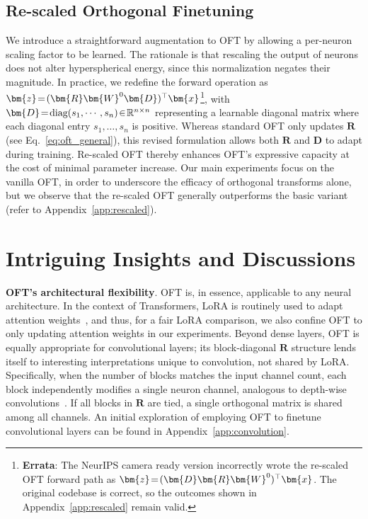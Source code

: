\subsection{Re-scaled Orthogonal Finetuning}

We introduce a straightforward augmentation to OFT by allowing a per-neuron scaling factor to be learned. The rationale is that rescaling the output of neurons does not alter hyperspherical energy, since this normalization negates their magnitude. In practice, we redefine the forward operation as $\thickmuskip=2mu \medmuskip=2mu\bm{z}=(\bm{R}\bm{W}^0\bm{D})^\top\bm{x}$\footnote{\textbf{Errata}: The NeurIPS camera ready version incorrectly wrote the re-scaled OFT forward path as $\thickmuskip=2mu \medmuskip=2mu\bm{z}=(\bm{D}\bm{R}\bm{W}^0)^\top\bm{x}$. The original codebase is correct, so the outcomes shown in Appendix~\ref{app:rescaled} remain valid.}, with $\thickmuskip=2mu \medmuskip=2mu \bm{D}=\text{diag}(s_1,\cdots,s_n)\in\mathbb{R}^{n\times n}$ representing a learnable diagonal matrix where each diagonal entry $s_1,\ldots,s_n$ is positive. Whereas standard OFT only updates $\bm{R}$ (see Eq.~\eqref{eq:oft_general}), this revised formulation allows both $\bm{R}$ and $\bm{D}$ to adapt during training. Re-scaled OFT thereby enhances OFT's expressive capacity at the cost of minimal parameter increase. Our main experiments focus on the vanilla OFT, in order to underscore the efficacy of orthogonal transforms alone, but we observe that the re-scaled OFT generally outperforms the basic variant (refer to Appendix~\ref{app:rescaled}).

\section{Intriguing Insights and Discussions}

\textbf{OFT's architectural flexibility}. OFT is, in essence, applicable to any neural architecture. In the context of Transformers, LoRA is routinely used to adapt attention weights~\cite{hulora2022}, and thus, for a fair LoRA comparison, we also confine OFT to only updating attention weights in our experiments. Beyond dense layers, OFT is equally appropriate for convolutional layers; its block-diagonal $\bm{R}$ structure lends itself to interesting interpretations unique to convolution, not shared by LoRA. Specifically, when the number of blocks matches the input channel count, each block independently modifies a single neuron channel, analogous to depth-wise convolutions~\cite{chollet2017xception}. If all blocks in $\bm{R}$ are tied, a single orthogonal matrix is shared among all channels. An initial exploration of employing OFT to finetune convolutional layers can be found in Appendix~\ref{app:convolution}.

